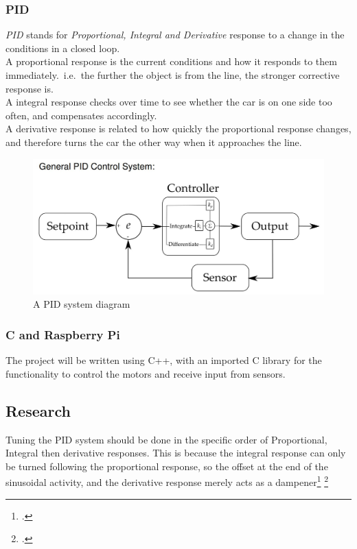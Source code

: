 \documentclass[paper=a4, fontsize=11pt]{scrartcl} %
\numberwithin{equation}{section} %
\numberwithin{figure}{section} %
\begin{document}
\subsubsection{PID}
\textit{PID} stands for \textit{Proportional, Integral and Derivative} response
to a change in the conditions in a closed loop.\\
A proportional response is the current conditions and how it responds to them
immediately.\ i.e.\ the further the object is from the line, the stronger
corrective response is.\\
A integral response checks over time to see whether the car is on one side too
often, and compensates accordingly.\\
A derivative response is related to how quickly the proportional response
changes, and therefore turns the car the other way when it approaches the line.
\begin{figure}[h]
  \centering
  \includegraphics[width=\textwidth]{pid.png}
  \caption{A PID system diagram\autocite{elfClosedLoops}}
\end{figure}
\subsubsection{C and Raspberry Pi}
The project will be written using C++, with  an imported C library for the
functionality to control the motors and receive input from sensors.\\
\subsection{Research}
Tuning the PID system should be done in the specific order of Proportional,
Integral then derivative responses. This is because the integral response can
only be turned following the proportional response, so the offset at the end of
the sinusoidal activity, and the derivative response merely acts as a
dampener\footcite{pidTuning}
\footcite{pidVid}
\end{document}
